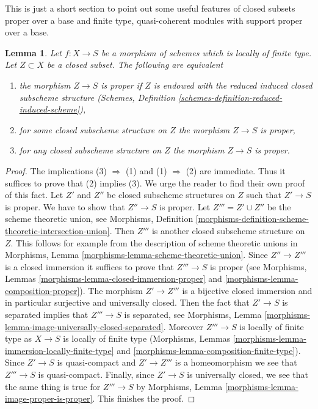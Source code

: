 \documentclass[10pt,a4paper]{amsart}
\theoremstyle{plain}
\newtheorem{lemma}[subsection]{Lemma}
\theoremstyle{definition}
\theoremstyle{remark}
\numberwithin{equation}{subsection}
\begin{document}
\noindent
This is just a short section to point out some useful features
of closed subsets proper over a base and finite type, quasi-coherent
modules with support proper over a base.

\begin{lemma}
\label{lemma-closed-proper-over-base}
Let $f : X \to S$ be a morphism of schemes which is locally of finite type.
Let $Z \subset X$ be a closed subset. The following are equivalent
\begin{enumerate}
\item the morphism $Z \to S$ is proper if $Z$ is endowed with the reduced
induced closed subscheme structure
(Schemes, Definition \ref{schemes-definition-reduced-induced-scheme}),
\item for some closed subscheme structure on $Z$ the morphism $Z \to S$
is proper,
\item for any closed subscheme structure on $Z$ the morphism
$Z \to S$ is proper.
\end{enumerate}
\end{lemma}

\begin{proof}
The implications (3) $\Rightarrow$ (1) and (1) $\Rightarrow$ (2)
are immediate. Thus it suffices to prove that (2) implies (3).
We urge the reader to find their own proof of this fact.
Let $Z'$ and $Z''$ be closed subscheme structures on $Z$
such that $Z' \to S$ is proper. We have to show that $Z'' \to S$ is proper.
Let $Z''' = Z' \cup Z''$ be the scheme theoretic union, see
Morphisms, Definition
\ref{morphisms-definition-scheme-theoretic-intersection-union}.
Then $Z'''$ is another closed subscheme structure on $Z$.
This follows for example from the description of scheme theoretic unions in
Morphisms, Lemma \ref{morphisms-lemma-scheme-theoretic-union}.
Since $Z'' \to Z'''$ is a closed immersion it suffices to prove
that $Z''' \to S$ is proper (see
Morphisms, Lemmas \ref{morphisms-lemma-closed-immersion-proper} and
\ref{morphisms-lemma-composition-proper}).
The morphism $Z' \to Z'''$ is a bijective closed immersion
and in particular surjective and universally closed.
Then the fact that $Z' \to S$ is separated implies that
$Z''' \to S$ is separated, see
Morphisms, Lemma \ref{morphisms-lemma-image-universally-closed-separated}.
Moreover $Z''' \to S$ is locally of finite type
as $X \to S$ is locally of finite type
(Morphisms, Lemmas \ref{morphisms-lemma-immersion-locally-finite-type} and
\ref{morphisms-lemma-composition-finite-type}).
Since $Z' \to S$ is quasi-compact and $Z' \to Z'''$ is a homeomorphism
we see that $Z''' \to S$ is quasi-compact.
Finally, since $Z' \to S$ is universally closed, we see that
the same thing is true for $Z''' \to S$ by
Morphisms, Lemma \ref{morphisms-lemma-image-proper-is-proper}.
This finishes the proof.
\end{proof}
\end{document}
